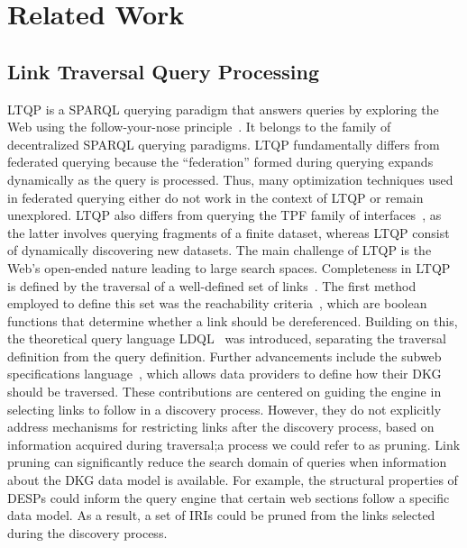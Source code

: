 \section{Related Work}\label{sec:related_work}

\subsection{Link Traversal Query Processing}
LTQP is a SPARQL querying paradigm that answers queries by exploring the Web using the follow-your-nose principle~\cite{hartig2016walking}.
It belongs to the family of decentralized SPARQL querying paradigms.
LTQP fundamentally differs from federated querying because the ``federation'' formed during querying expands dynamically as the query is processed.
Thus, many optimization techniques used in federated querying either do not work in the context of LTQP or remain unexplored.
LTQP also differs from querying the TPF family of interfaces~\cite{azzam2020smart,azzam2021wisekg, DBLP:journals/corr/HartigA16}, as the latter involves querying fragments of a finite dataset, whereas LTQP consist of dynamically discovering new datasets.
The main challenge of LTQP is the Web's open-ended nature leading to large search spaces.
Completeness in LTQP is defined by the traversal of a well-defined set of links~\cite{Hartig2012}.
The first method employed to define this set was the reachability criteria~\cite{Hartig2012}, which are boolean functions that determine whether a link should be dereferenced.
Building on this, the theoretical query language LDQL~\cite{hartigLDQL} was introduced, separating the traversal definition from the query definition.
Further advancements include the subweb specifications language~\cite{Bogaerts2021LinkTW}, which allows data providers to define how their DKG should be traversed.
These contributions are centered on guiding the engine in selecting links to follow in a discovery process.
However, they do not explicitly address mechanisms for restricting links after the discovery process, based on information acquired during traversal;a process we could refer to as pruning.
Link pruning can significantly reduce the search domain of queries when information about the DKG data model is available.
For example, the structural properties of DESPs could inform the query engine that certain web sections follow a specific data model. 
As a result, a set of IRIs could be pruned from the links selected during the discovery process.

